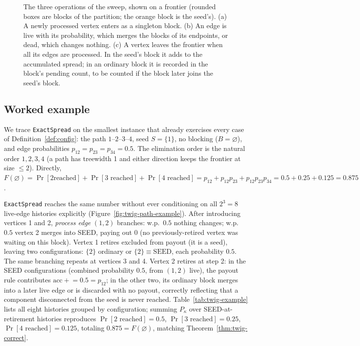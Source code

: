\documentclass[preprint,11pt]{elsarticle}
\theoremstyle{definition}
\theoremstyle{remark}
\begin{document}
\begin{figure}[t]
{}
\caption{The three operations of the sweep, shown on a frontier (rounded boxes are blocks of the partition; the orange block is the seed's). (a) A newly processed vertex enters as a singleton block. (b) An edge is live with its probability, which merges the blocks of its endpoints, or dead, which changes nothing. (c) A vertex leaves the frontier when all its edges are processed. In the seed's block it adds to the accumulated spread; in an ordinary block it is recorded in the block's pending count, to be counted if the block later joins the seed's block.}\label{fig:operations}
\end{figure}

\subsection{Worked example}\label{sec:twig-example}

We trace \texttt{ExactSpread} on the smallest instance that already
exercises every case of Definition~\ref{def:config}: the path
$1$--$2$--$3$--$4$, seed $S=\{1\}$, no blocking ($B=\varnothing$), and edge
probabilities $p_{12}=p_{23}=p_{34}=0.5$. The elimination order is the
natural order $1,2,3,4$ (a path has treewidth 1 and either direction keeps
the frontier at size $\le2$). Directly, $F(\varnothing)=\Pr[2\text{
reached}]+\Pr[3\text{ reached}]+\Pr[4\text{ reached}]
=p_{12}+p_{12}p_{23}+p_{12}p_{23}p_{34}=0.5+0.25+0.125=0.875$.

\texttt{ExactSpread} reaches the same number without ever conditioning on
all $2^3=8$ live-edge histories explicitly (Figure~\ref{fig:twig-path-example}).
After introducing vertices 1 and 2, \emph{process edge} $(1,2)$ branches: w.p.\
$0.5$ nothing changes; w.p.\ $0.5$ vertex 2 merges into SEED, paying out
$0$ (no previously-retired vertex was waiting on this block). Vertex 1
retires excluded from payout (it is a seed), leaving two configurations:
$\{2\}$ ordinary or $\{2\}\equiv\mathrm{SEED}$, each probability $0.5$. The
same branching repeats at vertices 3 and 4. Vertex 2 retires at step 2: in
the SEED configurations (combined probability $0.5$, from $(1,2)$ live),
the payout rule contributes $\mathrm{acc}\mathrel{+}=0.5=p_{12}$; in the
other two, its ordinary block merges into a later live edge or is
discarded with no payout, correctly reflecting that a component
disconnected from the seed is never reached. Table~\ref{tab:twig-example}
lists all eight histories grouped by configuration; summing $P_\kappa$
over SEED-at-retirement histories reproduces
$\Pr[2\text{ reached}]=0.5$, $\Pr[3\text{ reached}]=0.25$,
$\Pr[4\text{ reached}]=0.125$, totaling $0.875=F(\varnothing)$, matching
Theorem~\ref{thm:twig-correct}.
\end{document}
